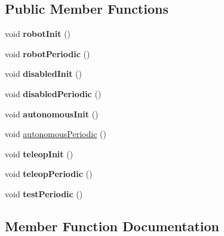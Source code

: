 \subsection*{Public Member Functions}
\begin{DoxyCompactItemize}
\item 
\mbox{\label{classfrc_1_1robot_1_1_robot_a1d28582cf3dc31568c3581f631c92f13}} 
void {\bfseries robot\+Init} ()
\item 
\mbox{\label{classfrc_1_1robot_1_1_robot_a7e63e32ebe8ad3d33bbc3b09092a9f1f}} 
void {\bfseries robot\+Periodic} ()
\item 
\mbox{\label{classfrc_1_1robot_1_1_robot_ac19810fbf26efd4cd47cbd7568b4ad2a}} 
void {\bfseries disabled\+Init} ()
\item 
\mbox{\label{classfrc_1_1robot_1_1_robot_a2bc1b0ce100e4783ba3d549e6ac07ae3}} 
void {\bfseries disabled\+Periodic} ()
\item 
\mbox{\label{classfrc_1_1robot_1_1_robot_a5b1c022cd3e2b9f6e5dde62571839173}} 
void {\bfseries autonomous\+Init} ()
\item 
void \hyperlink{classfrc_1_1robot_1_1_robot_a7dcfe7d0d65d1051eb095b8eb1aebd72}{autonomous\+Periodic} ()
\item 
\mbox{\label{classfrc_1_1robot_1_1_robot_a209dbf07bfec75d73fa53126a8e31b88}} 
void {\bfseries teleop\+Init} ()
\item 
\mbox{\label{classfrc_1_1robot_1_1_robot_ae807171661cbc29081bc10f06d6831e7}} 
void {\bfseries teleop\+Periodic} ()
\item 
\mbox{\label{classfrc_1_1robot_1_1_robot_abd152f34b9f33d5cdf835aa61331f33e}} 
void {\bfseries test\+Periodic} ()
\end{DoxyCompactItemize}


\subsection{Member Function Documentation}
\mbox{\label{classfrc_1_1robot_1_1_robot_a7dcfe7d0d65d1051eb095b8eb1aebd72}} 
